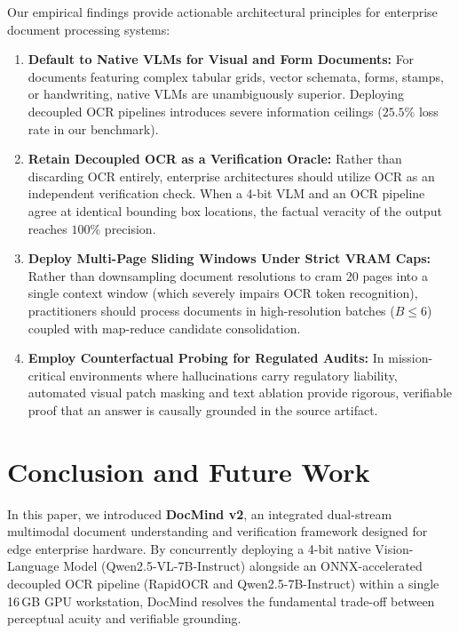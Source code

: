 \documentclass[conference]{IEEEtran}
\begin{document}
{Our empirical findings provide actionable architectural principles for enterprise document processing systems:
\begin{enumerate}
    \item \textbf{Default to Native VLMs for Visual and Form Documents:} For documents featuring complex tabular grids, vector schemata, forms, stamps, or handwriting, native VLMs are unambiguously superior. Deploying decoupled OCR pipelines introduces severe information ceilings ($25.5\%$ loss rate in our benchmark).
    \item \textbf{Retain Decoupled OCR as a Verification Oracle:} Rather than discarding OCR entirely, enterprise architectures should utilize OCR as an independent verification check. When a 4-bit VLM and an OCR pipeline agree at identical bounding box locations, the factual veracity of the output reaches $100\%$ precision.
    \item \textbf{Deploy Multi-Page Sliding Windows Under Strict VRAM Caps:} Rather than downsampling document resolutions to cram 20 pages into a single context window (which severely impairs OCR token recognition), practitioners should process documents in high-resolution batches ($B \le 6$) coupled with map-reduce candidate consolidation.
    \item \textbf{Employ Counterfactual Probing for Regulated Audits:} In mission-critical environments where hallucinations carry regulatory liability, automated visual patch masking and text ablation provide rigorous, verifiable proof that an answer is causally grounded in the source artifact.
\end{enumerate}

\section{Conclusion and Future Work}
In this paper, we introduced \textbf{DocMind v2}, an integrated dual-stream multimodal document understanding and verification framework designed for edge enterprise hardware. By concurrently deploying a 4-bit native Vision-Language Model (Qwen2.5-VL-7B-Instruct) alongside an ONNX-accelerated decoupled OCR pipeline (RapidOCR and Qwen2.5-7B-Instruct) within a single 16\,GB GPU workstation, DocMind resolves the fundamental trade-off between perceptual acuity and verifiable grounding.

}
\end{document}
